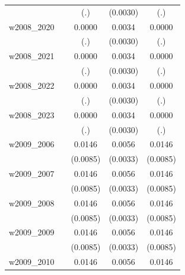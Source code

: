 \begin{table}[htbp]
\begin{tabular}{l*{4}{c}}
            &                     &         (.)         &    (0.0030)         &         (.)         \\
[1em]
w2008\_2020  &                     &      0.0000         &      0.0034         &      0.0000         \\
            &                     &         (.)         &    (0.0030)         &         (.)         \\
[1em]
w2008\_2021  &                     &      0.0000         &      0.0034         &      0.0000         \\
            &                     &         (.)         &    (0.0030)         &         (.)         \\
[1em]
w2008\_2022  &                     &      0.0000         &      0.0034         &      0.0000         \\
            &                     &         (.)         &    (0.0030)         &         (.)         \\
[1em]
w2008\_2023  &                     &      0.0000         &      0.0034         &      0.0000         \\
            &                     &         (.)         &    (0.0030)         &         (.)         \\
[1em]
w2009\_2006  &                     &      0.0146\sym{*}  &      0.0056\sym{*}  &      0.0146\sym{*}  \\
            &                     &    (0.0085)         &    (0.0033)         &    (0.0085)         \\
[1em]
w2009\_2007  &                     &      0.0146\sym{*}  &      0.0056\sym{*}  &      0.0146\sym{*}  \\
            &                     &    (0.0085)         &    (0.0033)         &    (0.0085)         \\
[1em]
w2009\_2008  &                     &      0.0146\sym{*}  &      0.0056\sym{*}  &      0.0146\sym{*}  \\
            &                     &    (0.0085)         &    (0.0033)         &    (0.0085)         \\
[1em]
w2009\_2009  &                     &      0.0146\sym{*}  &      0.0056\sym{*}  &      0.0146\sym{*}  \\
            &                     &    (0.0085)         &    (0.0033)         &    (0.0085)         \\
[1em]
w2009\_2010  &                     &      0.0146\sym{*}  &      0.0056\sym{*}  &      0.0146\sym{*}  \\

\end{tabular}
\end{table}
